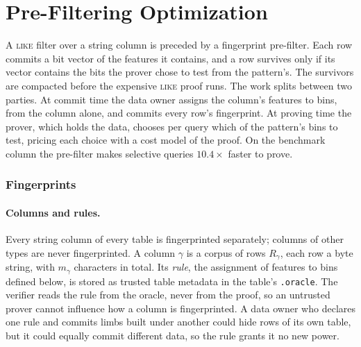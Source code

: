 \doclearpage
\section{Pre-Filtering Optimization}
\label{sec:fp-opt}

A \textsc{like} filter over a string column is preceded by a fingerprint
pre-filter. Each row commits a bit vector of the features it contains,
and a row survives only if its vector contains the bits the prover
chose to test from the pattern's. The survivors are compacted before the
expensive \textsc{like} proof runs. The work splits between two parties.
At commit time the data owner assigns the column's features to bins,
from the column alone, and commits every row's fingerprint. At proving
time the prover, which holds the data, chooses per query which of the
pattern's bins to test, pricing each choice with a cost model of the
proof. On the benchmark column the pre-filter makes selective queries
$10.4\times$ faster to prove.

\subsubsection{Fingerprints}

\paragraph{Columns and rules.}
Every string column of every table is fingerprinted separately; columns
of other types are never fingerprinted. A column $\gamma$ is a corpus of
rows $R_\gamma$, each row a byte string, with $m_\gamma$ characters in
total. Its \emph{rule}, the assignment of features to bins defined
below, is stored as trusted table metadata in the table's
\texttt{.oracle}. The verifier reads the rule from the oracle, never from
the proof, so an untrusted prover cannot influence how a column is
fingerprinted. A data owner who declares one rule and commits limbs built
under another could hide rows of its own table, but it could equally
commit different data, so the rule grants it no new power.

